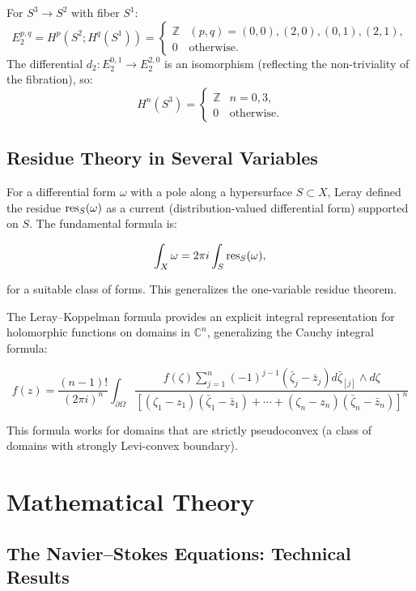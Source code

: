 \begin{example}
For $S^3 \to S^2$ with fiber $S^1$:
\[
E_2^{p,q} = H^p(S^2; H^q(S^1)) = 
\begin{cases}
\mathbb{Z} & (p,q) = (0,0), (2,0), (0,1), (2,1),\\
0 & \text{otherwise.}
\end{cases}
\]
The differential $d_2: E_2^{0,1} \to E_2^{2,0}$ is an isomorphism (reflecting the non-triviality of the fibration), so:
\[
H^n(S^3) = 
\begin{cases}
\mathbb{Z} & n = 0,3,\\
0 & \text{otherwise.}
\end{cases}
\]
\end{example}

\subsection{Residue Theory in Several Variables}

For a differential form $\omega$ with a pole along a hypersurface $S \subset X$, Leray defined the residue $\operatorname{res}_S(\omega)$ as a current (distribution-valued differential form) supported on $S$. The fundamental formula is:

\[
\int_X \omega = 2\pi i \int_S \operatorname{res}_S(\omega),
\]

for a suitable class of forms. This generalizes the one-variable residue theorem.

The Leray--Koppelman formula provides an explicit integral representation for holomorphic functions on domains in $\mathbb{C}^n$, generalizing the Cauchy integral formula:

\[
f(z) = \frac{(n-1)!}{(2\pi i)^n} \int_{\partial\Omega} \frac{f(\zeta) \sum_{j=1}^n (-1)^{j-1} (\bar\zeta_j - \bar z_j) d\bar\zeta_{[j]} \wedge d\zeta}{[(\zeta_1 - z_1)(\bar\zeta_1 - \bar z_1) + \cdots + (\zeta_n - z_n)(\bar\zeta_n - \bar z_n)]^n}
\]

This formula works for domains that are strictly pseudoconvex (a class of domains with strongly Levi-convex boundary).

\section{Mathematical Theory}

\subsection{The Navier--Stokes Equations: Technical Results}

